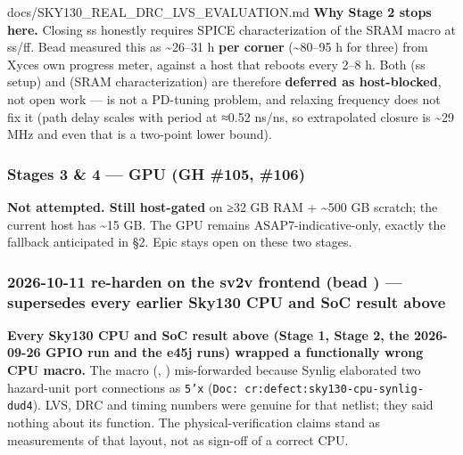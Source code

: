 \begin{relocated}{docs/SKY130_REAL_DRC_LVS_EVALUATION.md}
\textbf{Why Stage 2 stops here.} Closing ss honestly requires SPICE
characterization of the SRAM macro at ss/ff. Bead  measured
this as \textasciitilde26--31 h \textbf{per corner}
(\textasciitilde80--95 h for three) from Xyce\textquotesingle s own
progress meter, against a host that reboots every 2--8 h. Both
 (ss setup) and  (SRAM characterization) are
therefore \textbf{deferred as host-blocked}, not open work ---
 is not a PD-tuning problem, and relaxing frequency does not
fix it (path delay scales with period at ≈0.52 ns/ns, so extrapolated
closure is \textasciitilde29 MHz and even that is a two-point lower
bound).

\subsubsection{Stages 3 \& 4 --- GPU (GH \#105, \#106)}\label{tm:pd:sky130-real-drc-lvs:stages-3-4-gpu-gh-105-106}

\textbf{Not attempted. Still host-gated} on ≥32 GB RAM +
\textasciitilde500 GB scratch; the current host has \textasciitilde15
GB. The GPU remains ASAP7-indicative-only, exactly the fallback
anticipated in §2. Epic  stays open on these two stages.

\subsubsection{\texorpdfstring{2026-10-11 re-harden on the sv2v frontend
(bead ) --- supersedes every earlier Sky130 CPU and SoC
result
above}{2026-10-11 re-harden on the sv2v frontend (bead ) --- supersedes every earlier Sky130 CPU and SoC result above}}\label{tm:pd:sky130-real-drc-lvs:2026-10-11-re-harden-on-the-sv2v-frontend-bead-dud4-supersedes-every-earlier-sky130-cpu-and-soc-result-above}

\textbf{Every Sky130 CPU and SoC result above (Stage 1, Stage 2, the
2026-09-26 GPIO run and the e45j runs) wrapped a functionally wrong CPU
macro.} The macro (,
) mis-forwarded because Synlig elaborated two
hazard-unit port connections as \texttt{5'x}
(\texttt{Doc:\allowbreak{}\ cr:\allowbreak{}defect:\allowbreak{}sky130-\allowbreak{}cpu-\allowbreak{}synlig-\allowbreak{}dud4}).
LVS, DRC and timing numbers were genuine for that netlist; they said
nothing about its function. The physical-verification claims stand as
measurements of that layout, not as sign-off of a correct CPU.


\end{relocated}
